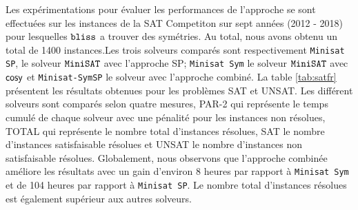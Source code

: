
Les expérimentations pour évaluer les performances de l'approche se sont effectuées sur les instances de la SAT Competiton sur sept années (2012 - 2018) pour lesquelles $\texttt{bliss}$ a trouver des symétries. Au total, nous avons obtenu un total de 1400 instances.Les trois solveurs comparés sont respectivement \texttt{Minisat SP}, le solveur $\texttt{MiniSAT}$ avec l'approche SP; \texttt{Minisat Sym} le solveur $\texttt{MiniSAT}$ avec $\textsf{cosy}$ et \texttt{Minisat-SymSP} le solveur avec l'approche combiné.
La table \ref{tab:satfr} présentent les résultats obtenues pour les problèmes SAT et UNSAT.
Les différent solveurs sont comparés selon quatre mesures, PAR-2 qui représente le temps cumulé de chaque solveur 
avec une pénalité pour les instances non résolues, \-TOTAL qui représente le nombre total d'instances résolues, SAT le nombre d'instances satisfaisable résolues et UNSAT le nombre d'instances  non satisfaisable résolues.
Globalement, nous observons que l'approche combinée améliore les résultats avec un gain d'environ 8 heures par rapport
à \texttt{Minisat Sym} et de 104 heures par rapport à \texttt{Minisat SP}. Le nombre total d'instances résolues est également
supérieur aux autres solveurs.



